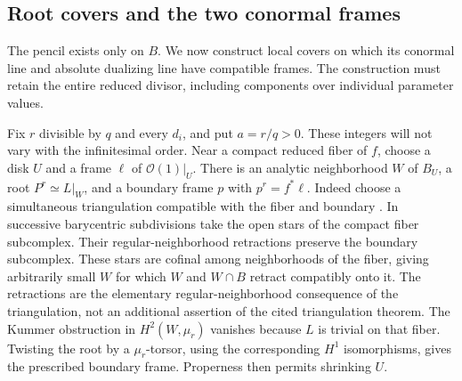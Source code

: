 \subsection{Root covers and the two conormal frames}\label{nu2:subsec:roots}

The pencil exists only on $B$.  We now construct local covers on which its conormal line and absolute dualizing line have compatible frames.  The construction must retain the entire reduced divisor, including components over individual parameter values.

Fix $r$ divisible by $q$ and every $d_i$, and put $a=r/q>0$.
These integers will not vary with the infinitesimal order.
Near a compact reduced fiber of $f$, choose a disk $U$ and a frame
$\ell$ of $\mathcal O(1)|_U$.  There is an analytic neighborhood
$W$ of $B_U$, a root $P^r\simeq L|_W$, and a boundary frame $p$
with $p^r=f^*\ell$.  Indeed choose a simultaneous triangulation compatible with the fiber
and boundary \cite[Theorem~1.10]{Coste2007}.  In successive barycentric
subdivisions take the open stars of the compact fiber subcomplex.
Their regular-neighborhood retractions preserve the boundary
subcomplex.  These stars are cofinal among neighborhoods of the
fiber, giving arbitrarily small $W$ for which $W$ and $W\cap B$
retract compatibly onto it.  The retractions are the elementary
regular-neighborhood consequence of the triangulation, not an
additional assertion of the cited triangulation theorem.
The Kummer obstruction in $H^2(W,\mu_r)$ vanishes because $L$ is
trivial on that fiber.  Twisting the root by a $\mu_r$-torsor,
using the corresponding $H^1$ isomorphisms, gives the prescribed
boundary frame.  Properness then permits shrinking $U$.

